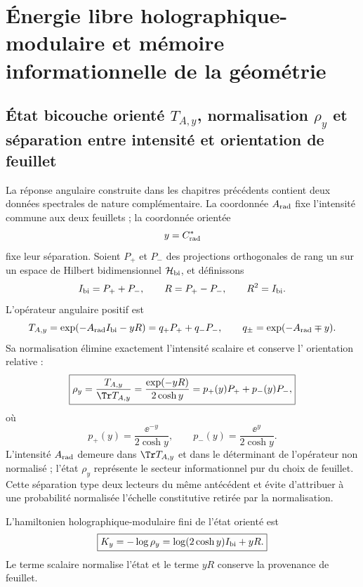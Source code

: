 \chapter{Énergie libre holographique-modulaire et mémoire informationnelle de la géométrie}
\label{chap:energia-libre-holografica}

\section{État bicouche orienté \(T_{A,y}\), normalisation \(\rho_y\) et séparation entre intensité et orientation de feuillet}

La réponse angulaire construite dans les chapitres précédents contient deux
données spectrales de nature complémentaire. La coordonnée
\(A_{\rm rad}\) fixe l'intensité commune aux deux feuillets ; la coordonnée
orientée
\[
 y=C^{*}_{\rm rad}
\]
fixe leur séparation. Soient \(P_+\) et \(P_-\) des projections orthogonales de
rang un sur un espace de Hilbert bidimensionnel \(\mathcal H_{\rm bi}\),
et définissons
\begin{equation}
 I_{\rm bi}=P_++P_-,
 \qquad
 R=P_+-P_-,
 \qquad
 R^2=I_{\rm bi}.
 \label{eq:rm-info-graduacion}
\end{equation}
L'opérateur angulaire positif est
\begin{equation}
 T_{A,y}
 =\exp(-A_{\rm rad}I_{\rm bi}-yR)
 =q_+P_++q_-P_-,
 \qquad
 q_\pm=\exp(-A_{\rm rad}\mp y).
 \label{eq:rm-info-operador-angular}
\end{equation}
Sa normalisation élimine exactement l'intensité scalaire et conserve l'
orientation relative :
\begin{equation}
 \boxed{
 \rho_y
 =\frac{T_{A,y}}{\Tr T_{A,y}}
 =\frac{\exp(-yR)}{2\cosh y}
 =p_+(y)P_++p_-(y)P_- ,}
 \label{eq:rm-info-rho-y}
\end{equation}
où
\begin{equation}
 p_+(y)=\frac{\ee^{-y}}{2\cosh y},
 \qquad
 p_-(y)=\frac{\ee^{y}}{2\cosh y}.
 \label{eq:rm-info-probabilidades-hoja}
\end{equation}
L'intensité \(A_{\rm rad}\) demeure dans \(\Tr T_{A,y}\) et dans le
déterminant de l'opérateur non normalisé ; l'état \(\rho_y\) représente le
secteur informationnel pur du choix de feuillet. Cette séparation type deux
lecteurs du même antécédent et évite d'attribuer à une probabilité
normalisée l'échelle constitutive retirée par la normalisation.

\begin{definition}
L'hamiltonien holographique-modulaire fini de l'état orienté est
\begin{equation}
 \boxed{
 K_y=-\log\rho_y
 =\log(2\cosh y)I_{\rm bi}+yR.}
 \label{eq:rm-info-hamiltoniano-bicapa}
\end{equation}
Le terme scalaire normalise l'état et le terme \(yR\) conserve la
provenance de feuillet.
\end{definition}

